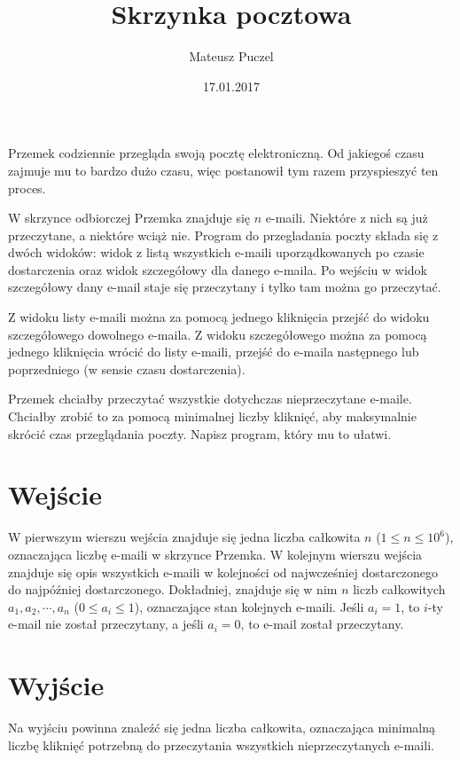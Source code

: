 \documentclass[zad,zawodnik,utf8]{sinol}
\title{Skrzynka pocztowa}
\author{Mateusz Puczel} %
\date{17.01.2017}
\begin{document}
\begin{tasktext}%

Przemek codziennie przegląda swoją pocztę elektroniczną. Od jakiegoś czasu zajmuje mu to bardzo dużo czasu, więc postanowił tym razem przyspieszyć ten proces.

W skrzynce odbiorczej Przemka znajduje się $n$ e-maili. Niektóre z nich są już przeczytane, a niektóre wciąż nie.
Program do przegladania poczty składa się z dwóch widoków: widok z listą wszystkich e-maili uporządkowanych po czasie dostarczenia oraz
widok szczegółowy dla danego e-maila. Po wejściu w widok szczegółowy dany e-mail staje się przeczytany i tylko tam można go przeczytać.

Z widoku listy e-maili można za pomocą jednego kliknięcia przejść do widoku szczegółowego dowolnego e-maila. Z widoku szczegółowego można za pomocą jednego kliknięcia
wrócić do listy e-maili, przejść do e-maila następnego lub poprzedniego (w sensie czasu dostarczenia).

Przemek chciałby przeczytać wszystkie dotychczas nieprzeczytane e-maile. Chciałby zrobić to za pomocą minimalnej liczby kliknięć, aby maksymalnie skrócić
czas przeglądania poczty. Napisz program, który mu to ułatwi.

  \section{Wejście}
W pierwszym wierszu wejścia znajduje się jedna liczba całkowita $n$ ($1 \leq n \leq 10^6$), oznaczająca liczbę e-maili w skrzynce Przemka.
W kolejnym wierszu wejścia znajduje się opis wszystkich e-maili w kolejności od najwcześniej dostarczonego do najpóźniej dostarczonego.
Dokładniej, znajduje się w nim $n$ liczb całkowitych $a_1, a_2, \cdots, a_n$ ($0 \leq a_i \leq 1$), oznaczające stan kolejnych e-maili.
Jeśli $a_i = 1$, to $i$-ty e-mail nie został przeczytany, a jeśli $a_i = 0$, to e-mail został przeczytany.

  \section{Wyjście}
Na wyjściu powinna znaleźć się jedna liczba całkowita, oznaczająca minimalną liczbę kliknięć potrzebną do przeczytania wszystkich nieprzeczytanych e-maili.
  
\makecompactexample

\end{tasktext}
\end{document}
